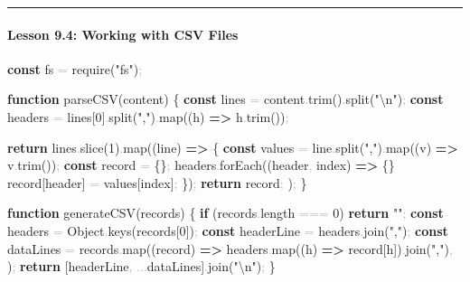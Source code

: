 \documentclass[
  justified,
  openright,
]{tufte-book}
\let\subsection\paragraph
\let\paragraph\paragraph
\newcommand{\KeywordTok}[1]{\textcolor{CodeKeyword}{\textbf{#1}}}  %
\newcommand{\StringTok}[1]{\textcolor{CodeString}{#1}}              %
\newcommand{\CodeNumTok}[1]{\textcolor{CodeNumber}{#1}}             %
\newcommand{\CodeFuncTok}[1]{\textcolor{CodeKeyword}{#1}}           %
\newcommand{\CodeTypeTok}[1]{\textcolor{CodeType}{#1}}              %
\newcommand{\CodeAccentTok}[1]{\textcolor{CodeAccent}{#1}}          %
\newcommand{\OperatorTok}[1]{\textcolor{DarkGray}{#1}}              %
\newenvironment{Shaded}{%
  \begin{mdframed}[style=TufteCode]%
}{%
  \end{mdframed}%
}
\let\subsection\paragraph
\let\paragraph\paragraph
\begin{document}
\begin{center}\rule{0.5\linewidth}{0.5pt}\end{center}

\subsection{Lesson 9.4: Working with CSV
Files}\label{lesson-9.4-working-with-csv-files}

\begin{Shaded}
\begin{Highlighting}[]
\KeywordTok{const} fs \OperatorTok{=} \CodeAccentTok{require}(\StringTok{"fs"})\OperatorTok{;}
 
\KeywordTok{function} \CodeFuncTok{parseCSV}(content) \{
  \KeywordTok{const} lines \OperatorTok{=} content\OperatorTok{.}\CodeFuncTok{trim}()\OperatorTok{.}\CodeFuncTok{split}(\StringTok{"}\StringTok{\textbackslash{}n}\StringTok{"})\OperatorTok{;}
  \KeywordTok{const} headers \OperatorTok{=} lines[\CodeNumTok{0}]\OperatorTok{.}\CodeFuncTok{split}(\StringTok{","})\OperatorTok{.}\CodeFuncTok{map}((h) \KeywordTok{=\textgreater{}} h\OperatorTok{.}\CodeFuncTok{trim}())\OperatorTok{;}
 
  \KeywordTok{return} lines\OperatorTok{.}\CodeFuncTok{slice}(\CodeNumTok{1})\OperatorTok{.}\CodeFuncTok{map}((line) \KeywordTok{=\textgreater{}} \{
    \KeywordTok{const} values \OperatorTok{=} line\OperatorTok{.}\CodeFuncTok{split}(\StringTok{","})\OperatorTok{.}\CodeFuncTok{map}((v) \KeywordTok{=\textgreater{}} v\OperatorTok{.}\CodeFuncTok{trim}())\OperatorTok{;}
    \KeywordTok{const} record \OperatorTok{=} \{\}\OperatorTok{;}
    headers\OperatorTok{.}\CodeFuncTok{forEach}((header\OperatorTok{,} index) \KeywordTok{=\textgreater{}} \{\}
      record[header] \OperatorTok{=} values[index]\OperatorTok{;}
    \})\OperatorTok{;}
    \KeywordTok{return} record\OperatorTok{;}
  )\OperatorTok{;}
\}
 
\KeywordTok{function} \CodeFuncTok{generateCSV}(records) \{
  \KeywordTok{if} (records\OperatorTok{.}\CodeTypeTok{length} \OperatorTok{===} \CodeNumTok{0}) \KeywordTok{return} \StringTok{""}\OperatorTok{;}
  \KeywordTok{const} headers \OperatorTok{=} Object\OperatorTok{.}\CodeFuncTok{keys}(records[\CodeNumTok{0}])\OperatorTok{;}
  \KeywordTok{const} headerLine \OperatorTok{=} headers\OperatorTok{.}\CodeFuncTok{join}(\StringTok{","})\OperatorTok{;}
  \KeywordTok{const} dataLines \OperatorTok{=} records\OperatorTok{.}\CodeFuncTok{map}((record) \KeywordTok{=\textgreater{}}
    headers\OperatorTok{.}\CodeFuncTok{map}((h) \KeywordTok{=\textgreater{}} record[h])\OperatorTok{.}\CodeFuncTok{join}(\StringTok{","})\OperatorTok{,}
  )\OperatorTok{;}
  \KeywordTok{return} [headerLine\OperatorTok{,} \OperatorTok{...}dataLines]\OperatorTok{.}\CodeFuncTok{join}(\StringTok{"}\StringTok{\textbackslash{}n}\StringTok{"})\OperatorTok{;}
\}
 

\end{Highlighting}
\end{Shaded}
\end{document}

